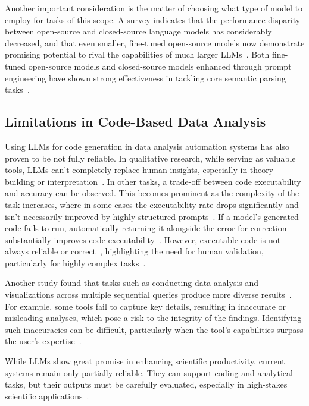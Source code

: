 \documentclass{DESSThesis}
\begin{document}
Another important consideration is the matter of choosing what type of model to employ for tasks of this scope. A survey indicates that the performance disparity between open-source and closed-source language models has considerably decreased, and that even smaller, fine-tuned open-source models now demonstrate promising potential to rival the capabilities of much larger LLMs~\cite{10.1145/3737873}. Both fine-tuned open-source models and closed-source models enhanced through prompt engineering have shown strong effectiveness in tackling core semantic parsing tasks~\cite{10.1145/3737873}.

\subsection{Limitations in Code-Based Data Analysis}

Using LLMs for code generation in data analysis automation systems has also proven to be not fully reliable. In qualitative research, while serving as valuable tools, LLMs can't completely replace human insights, especially in theory building or interpretation~\cite{chew2023llmassistedcontentanalysisusing}. In other tasks, a trade-off between code executability and accuracy can be observed. This becomes prominent as the complexity of the task increases, where in some cases the executability rate drops significantly and isn't necessarily improved by highly structured prompts~\cite{10.1371/journal.pone.0317084}. If a model's generated code fails to run, automatically returning it alongside the error for correction substantially improves code executability~\cite{10.1371/journal.pone.0317084}. However, executable code is not always reliable or correct~\cite{https://doi.org/10.1002/smr.2723}, highlighting the need for human validation, particularly for highly complex tasks~\cite{10.1371/journal.pone.0317084}.

Another study found that tasks such as conducting data analysis and visualizations across multiple sequential queries produce more diverse results~\cite{https://doi.org/10.1002/smr.2723}. For example, some tools fail to capture key details, resulting in inaccurate or misleading analyses, which pose a risk to the integrity of the findings. Identifying such inaccuracies can be difficult, particularly when the tool's capabilities surpass the user's expertise~\cite{https://doi.org/10.1002/smr.2723}. 

While LLMs show great promise in enhancing scientific productivity, current systems remain only partially reliable. They can support coding and analytical tasks, but their outputs must be carefully evaluated, especially in high-stakes scientific applications~\cite{https://doi.org/10.1002/smr.2723}.
\end{document}
